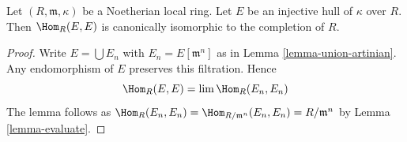 \begin{lemma}
\label{lemma-endos}
Let $(R, \mathfrak m, \kappa)$ be a Noetherian local ring.
Let $E$ be an injective hull of $\kappa$ over $R$. Then
$\Hom_R(E, E)$ is canonically isomorphic to the completion of $R$.
\end{lemma}

\begin{proof}
Write $E = \bigcup E_n$ with $E_n = E[\mathfrak m^n]$ as in
Lemma \ref{lemma-union-artinian}. Any endomorphism of $E$
preserves this filtration. Hence
$$
\Hom_R(E, E) = \lim \Hom_R(E_n, E_n)
$$
The lemma follows as
$\Hom_R(E_n, E_n) = \Hom_{R/\mathfrak m^n}(E_n, E_n) = R/\mathfrak m^n$
by Lemma \ref{lemma-evaluate}.
\end{proof}
